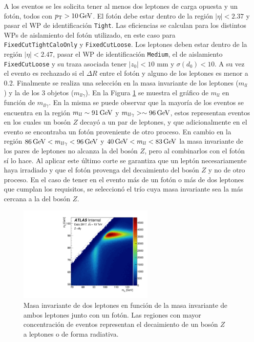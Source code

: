 

A los eventos se les solicita tener al menos dos leptones de carga opuesta y un fotón, todos con $p_{\text{T}}>10\,\text{GeV}$. El fotón debe estar dentro de la región $|\eta| < 2.37$ y pasar el WP de identificación \texttt{Tight}. Las eficiencias se calculan para los distintos WPs de aislamiento del fotón utilizado, en este caso para \texttt{FixedCutTightCaloOnly} y \texttt{FixedCutLoose}. Los leptones deben estar dentro de la región $|\eta| < 2.47$, pasar el WP de identificación \texttt{Medium}, el de aislamiento \texttt{FixedCutLoose} y su traza asociada tener $|z_0| < 10$ mm y $\sigma(d_0) < 10$. A su vez el evento es rechazado si el $\Delta R$ entre el fotón y alguno de los leptones es menor a 0.2. Finalmente se realiza una selección en la masa invariante de los leptones ($m_{ll}$) y la de los 3 objetos ($m_{ll\gamma}$). En la Figura \ref{mllgmll} se muestra el gráfico de $m_{ll}$ en función de $m_{ll\gamma}$. En la misma se puede observar que la mayoría de los eventos se encuentra en la región $m_{ll}\sim91\,\text{GeV}$ y $m_{ll\gamma}>\sim96\,\text{GeV}$, estos representan eventos en los cuales un bosón $Z$ decayó a un par de leptones, y que adicionalmente en el evento se encontraba un fotón proveniente de otro proceso. En cambio en la región $86\,\text{GeV}<m_{ll\gamma}<96\,\text{GeV}$ y $40\,\text{GeV}<m_{ll}<83\,\text{GeV}$ la masa invariante de los pares de leptones no alcanza la del bosón $Z$, pero al combinarlos con el fotón sí lo hace. Al aplicar este último corte se garantiza que un leptón necesariamente haya irradiado y que el fotón provenga del decaimiento del bosón $Z$ y no de otro proceso. En el caso de tener en el evento más de un fotón o más de dos leptones que cumplan los requisitos, se seleccionó el trío cuya masa invariante sea la más cercana a la del bosón $Z$.

\begin{figure}
  \centering
  \includegraphics[width=0.6\textwidth]{images/trigger/h_mllg_mll.pdf}
	\caption{Masa invariante de dos leptones en función de la masa invariante de ambos leptones junto con un fotón. Las regiones con mayor concentración de eventos representan el decaimiento de un bosón $Z$ a leptones o de forma radiativa.}
  \label{mllgmll}
\end{figure}

